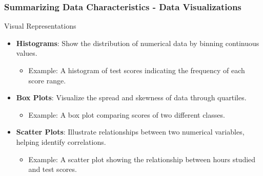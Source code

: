 \documentclass[aspectratio=169]{beamer}
\begin{document}
\begin{frame}[fragile]
    \frametitle{Summarizing Data Characteristics - Data Visualizations}
    \begin{block}{Visual Representations}
        \begin{itemize}
            \item \textbf{Histograms}: Show the distribution of numerical data by binning continuous values.
                \begin{itemize}
                    \item Example: A histogram of test scores indicating the frequency of each score range.
                \end{itemize}
            \item \textbf{Box Plots}: Visualize the spread and skewness of data through quartiles.
                \begin{itemize}
                    \item Example: A box plot comparing scores of two different classes.
                \end{itemize} 
            \item \textbf{Scatter Plots}: Illustrate relationships between two numerical variables, helping identify correlations.
                \begin{itemize}
                    \item Example: A scatter plot showing the relationship between hours studied and test scores.
                \end{itemize}
        \end{itemize}
    \end{block}
\end{frame}
\end{document}
